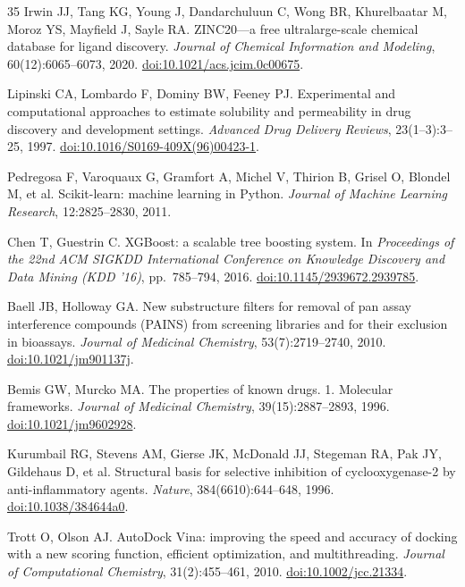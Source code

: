 \documentclass[11pt]{article}
\begin{document}
\begin{thebibliography}{35}
Irwin JJ, Tang KG, Young J, Dandarchuluun C, Wong BR, Khurelbaatar M, Moroz YS, Mayfield J, Sayle RA.
ZINC20---a free ultralarge-scale chemical database for ligand discovery.
\textit{Journal of Chemical Information and Modeling}, 60(12):6065--6073, 2020.
\href{https://doi.org/10.1021/acs.jcim.0c00675}{doi:10.1021/acs.jcim.0c00675}.

Lipinski CA, Lombardo F, Dominy BW, Feeney PJ.
Experimental and computational approaches to estimate solubility and permeability in drug discovery and development settings.
\textit{Advanced Drug Delivery Reviews}, 23(1--3):3--25, 1997.
\href{https://doi.org/10.1016/S0169-409X(96)00423-1}{doi:10.1016/S0169-409X(96)00423-1}.

Pedregosa F, Varoquaux G, Gramfort A, Michel V, Thirion B, Grisel O, Blondel M, et al.
Scikit-learn: machine learning in Python.
\textit{Journal of Machine Learning Research}, 12:2825--2830, 2011.

Chen T, Guestrin C.
XGBoost: a scalable tree boosting system.
In \textit{Proceedings of the 22nd ACM SIGKDD International Conference on Knowledge Discovery and Data Mining (KDD '16)}, pp.\ 785--794, 2016.
\href{https://doi.org/10.1145/2939672.2939785}{doi:10.1145/2939672.2939785}.

Baell JB, Holloway GA.
New substructure filters for removal of pan assay interference compounds (PAINS) from screening libraries and for their exclusion in bioassays.
\textit{Journal of Medicinal Chemistry}, 53(7):2719--2740, 2010.
\href{https://doi.org/10.1021/jm901137j}{doi:10.1021/jm901137j}.

Bemis GW, Murcko MA.
The properties of known drugs. 1. Molecular frameworks.
\textit{Journal of Medicinal Chemistry}, 39(15):2887--2893, 1996.
\href{https://doi.org/10.1021/jm9602928}{doi:10.1021/jm9602928}.

Kurumbail RG, Stevens AM, Gierse JK, McDonald JJ, Stegeman RA, Pak JY, Gildehaus D, et al.
Structural basis for selective inhibition of cyclooxygenase-2 by anti-inflammatory agents.
\textit{Nature}, 384(6610):644--648, 1996.
\href{https://doi.org/10.1038/384644a0}{doi:10.1038/384644a0}.

Trott O, Olson AJ.
AutoDock Vina: improving the speed and accuracy of docking with a new scoring function, efficient optimization, and multithreading.
\textit{Journal of Computational Chemistry}, 31(2):455--461, 2010.
\href{https://doi.org/10.1002/jcc.21334}{doi:10.1002/jcc.21334}.


\end{thebibliography}
\end{document}
